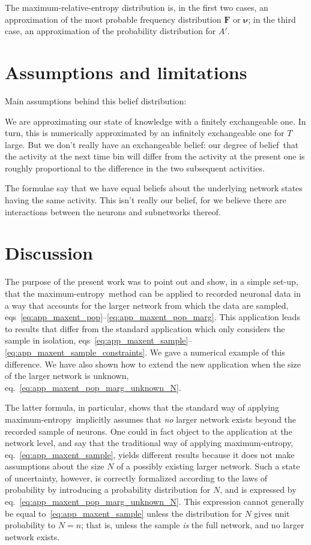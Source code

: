 \documentclass[\ifafour a4paper,12pt,\else a5paper,10pt,\fi%
onecolumn,oneside,article,%
british%
]{memoir}
\theoremstyle{remark}
\theoremstyle{innote}
\renewcommand*{\|}{\nonscript\,\vert\nonscript\;\mathopen{}}
\newcommand*{\eqn}{eq.}%
\newcommand*{\eqns}{eqs}%
\newcommand*{\dob}{degree of belief}
\newcommand*{\yAv}{A}
\newcommand*{\yNv}{N}
\newcommand*{\yFF}{F}
\newcommand*{\yF}{\bm{\yFF}}
\newcommand*{\yA}{\yAv}%
\newcommand*{\ynuu}{\nu}
\newcommand*{\ynu}{\bm{\ynuu}}
\newcommand*{\me}{maximum-entropy}
\begin{document}
\bigskip

The maximum-relative-entropy distribution is, in the first two cases, an
approximation of the most probable frequency distribution $\yF$ or $\ynu$;
in the third case, an approximation of the probability distribution for
$\yA'$.

\section{Assumptions and limitations}
\label{sec:assumptions}

Main assumptions behind this belief distribution:

We are approximating our state of knowledge with a finitely exchangeable
one. In turn, this is numerically approximated by an infinitely
exchangeable one for $T$ large. But we don't really have an exchangeable
belief: our \dob\ that the activity at the next time bin will
differ from the activity at the present one is roughly proportional to the
difference in the two subsequent activities.

The formulae say that we have equal beliefs about the underlying network
states having the same activity. This isn't really our belief, for we
believe there are interactions between the neurons and subnetworks thereof.


\section{Discussion}
\label{sec:discussion}

The purpose of the present work was to point out and show, in a simple
set-up, that the \me\ method can be applied to recorded neuronal data in a
way that accounts for the larger network from which the data are
sampled, \eqns~\eqref{eq:app_maxent_pop}--\eqref{eq:app_maxent_pop_marg}.
This application leads to results that differ from the standard application
which only considers the sample in isolation,
\eqns~\eqref{eq:app_maxent_sample}--\eqref{eq:app_maxent_sample_constraints}.
We gave a numerical example of this difference. We have also shown how to
extend the new application when the size of the larger network is
unknown, \eqn~\eqref{eq:app_maxent_pop_marg_unknown_N}.

The latter formula, in particular, shows that the standard way of applying
\me\ 
implicitly assumes that \emph{no} larger network exists beyond the
recorded sample of neurons. One could in fact object to the application at
the network level, and say that the traditional way of applying \me,
\eqn~\eqref{eq:app_maxent_sample}, yields different results because it does
not make assumptions about the size $\yNv$ of a possibly existing larger
network. Such a state of uncertainty, however, is correctly formalized
according to the laws of probability by introducing a probability
distribution for $\yNv$, and is expressed by
\eqn~\eqref{eq:app_maxent_pop_marg_unknown_N}. This expression cannot
generally be equal to~\eqref{eq:app_maxent_sample} unless the distribution
for $\yNv$ gives unit probability to $\yNv=n$; that is, unless the sample
\emph{is} the full network, and no larger network exists.
\end{document}
